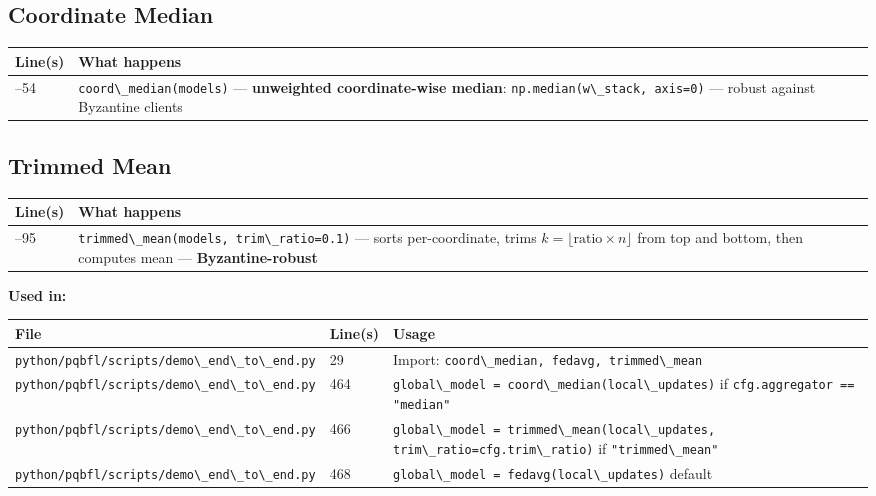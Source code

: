 \documentclass[11pt,a4paper]{article}
\newcommand{\code}[1]{\lstinline[basicstyle=\ttfamily\small]!#1!}
\begin{document}
\subsection{Coordinate Median}

\begin{longtable}{L{2.2cm} L{11.5cm}}
\toprule
\textbf{Line(s)} & \textbf{What happens} \\
\midrule
\endhead
\bottomrule
{}--54 & \code{coord\_median(models)} --- \textbf{unweighted coordinate-wise median}: \code{np.median(w\_stack, axis=0)} --- robust against Byzantine clients \\
\end{longtable}

\subsection{Trimmed Mean}

\begin{longtable}{L{2.2cm} L{11.5cm}}
\toprule
\textbf{Line(s)} & \textbf{What happens} \\
\midrule
\endhead
\bottomrule
{}--95 & \code{trimmed\_mean(models, trim\_ratio=0.1)} --- sorts per-coordinate, trims $k = \lfloor \text{ratio} \times n \rfloor$ from top and bottom, then computes mean --- \textbf{Byzantine-robust} \\
\end{longtable}

\textbf{Used in:}

\begin{longtable}{L{5.5cm} L{1.8cm} L{7cm}}
\toprule
\textbf{File} & \textbf{Line(s)} & \textbf{Usage} \\
\midrule
\endhead
\bottomrule
\endfoot
\code{python/pqbfl/scripts/demo\_end\_to\_end.py} & 29  & Import: \code{coord\_median, fedavg, trimmed\_mean} \\
\code{python/pqbfl/scripts/demo\_end\_to\_end.py} & 464 & \code{global\_model = coord\_median(local\_updates)} if \code{cfg.aggregator == "median"} \\
\code{python/pqbfl/scripts/demo\_end\_to\_end.py} & 466 & \code{global\_model = trimmed\_mean(local\_updates, trim\_ratio=cfg.trim\_ratio)} if \code{"trimmed\_mean"} \\
\code{python/pqbfl/scripts/demo\_end\_to\_end.py} & 468 & \code{global\_model = fedavg(local\_updates)} default \\
\end{longtable}
\end{document}
